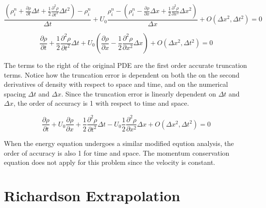 \documentclass{mc2015}
\begin{document}
    \begin{equation}
    	\label{eq:MEA_start}
    	\frac{ \left( \rho_{i}^{n} + \frac{\partial \rho}{\partial t} \Delta t +
    	\frac{1}{2} \frac{\partial^2 \rho}{\partial t^2} \Delta t^2 \right)-\rho_{i}^{n} }{\Delta t} 
    	+ U_{0} \frac{\rho_{i}^{n} - \left( \rho_{i}^{n} -  \frac{\partial \rho}{\partial x} \Delta x + 
    	\frac{1}{2} \frac{\partial^2 \rho}{\partial x^2} \Delta x^2 \right)}{\Delta x} 
    	+ O(\Delta x^{2},\Delta t^{2}) 
    	= 0
    \end{equation}
    
    \begin{equation}
    	\label{eq:MEA_p0}
    	 \frac{\partial \rho}{\partial t}  + \frac{1}{2} \frac{\partial^2 \rho}{\partial t^2} \Delta t +
    	 U_{0} \left(   \frac{\partial \rho}{\partial x}  - \frac{1}{2} \frac{\partial^2 \rho}{\partial x^2} \Delta x \right) 
    	 + O(\Delta x^{2},\Delta t^{2}) 
    	 = 0
    \end{equation}
    
    The terms to the right of the original PDE are the first order accurate
    truncation terms. Notice how the truncation error is  dependent on both the
    on the second derivatives of density with respect to space and time, and on
    the numerical spacing $\Delta t$ and $\Delta x$. Since the truncation
    error is linearly dependent on $\Delta t$ and $\Delta x$, the order of
    accuracy is 1 with respect to time and space. 
    
    \begin{equation}
    	\label{eq:MEA_p1}
    	 \frac{\partial \rho}{\partial t}  +  U_{0} \frac{\partial \rho}{\partial x} + 
    	 \frac{1}{2} \frac{\partial^2 \rho}{\partial t^2} \Delta t -
    	   U_{0}  \frac{1}{2} \frac{\partial^2 \rho}{\partial x^2} \Delta x  
    	   + O(\Delta x^{2},\Delta t^{2}) = 0 
    \end{equation} 
    
    When the energy equation undergoes a similar modified eqution analysis, the
    order of accuracy is also 1 for time and space. The momentum conservation
    equation does not apply for this problem since the velocity is
    constant.
    

\section{Richardson Extrapolation}
\end{document}
